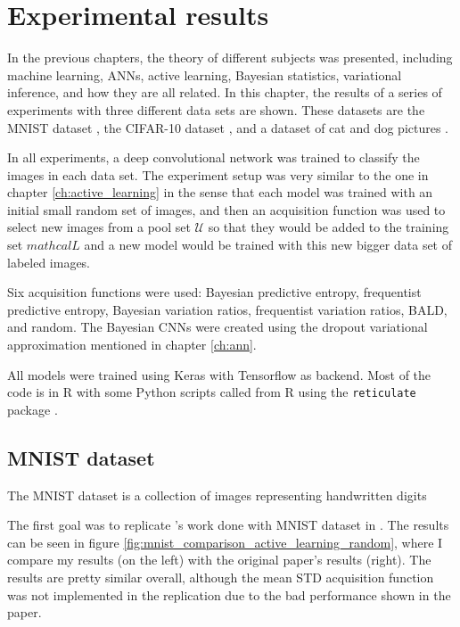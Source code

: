 
\chapter{Experimental results}
\label{ch:results}

In the previous chapters, the theory of different subjects was presented, including machine learning, ANNs, active learning, Bayesian statistics, variational inference, and how they are all related. In this chapter, the results of a series of experiments with three different data sets are shown. These datasets are the MNIST dataset \cite{lecun1998gradient}, the CIFAR-10 dataset \cite{krizhevsky2009learning}, and a dataset of cat and dog pictures \cite{elson2007asirra}.

In all experiments, a deep convolutional network was trained to classify the images in each data set. The experiment setup was very similar to the one in chapter \ref{ch:active_learning} in the sense that each model was trained with an initial small random set of images, and then an acquisition function was used to select new images from a pool set $\mathcal{U}$ so that they would be added to the training set $mathcal{L}$ and a new model would be trained with this new bigger data set of labeled images.

Six acquisition functions were used: Bayesian predictive entropy, frequentist predictive entropy, Bayesian variation ratios, frequentist variation ratios, BALD, and random. The Bayesian CNNs were created using the dropout variational approximation mentioned in chapter \ref{ch:ann}.

All models were trained using Keras\cite{chollet2015keras} with Tensorflow \cite{tensorflow2015-whitepaper} as backend. Most of the code is in R with some Python scripts called from R using the \texttt{reticulate} package \cite{reticulate_package}.

\section{MNIST dataset}

The MNIST dataset is a collection of images representing  handwritten digits

The first goal was to replicate \citeauthor{Gal2016Active}'s work done with MNIST dataset in . The results can be seen in figure \ref{fig:mnist_comparison_active_learning_random}, where I compare my results (on the left) with the original paper's results (right). The results are pretty similar overall, although the mean STD acquisition function was not implemented in the replication due to the bad performance shown in the paper.

